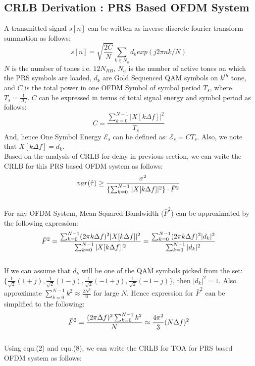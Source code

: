 \documentclass{article}
\begin{document}
\subsection{CRLB Derivation : PRS Based OFDM System}
A transmitted signal $s[n]$ can be written as inverse discrete fourier transform summation as follows:
$$s[n] = \sqrt{\frac{2C}{N}} \sum_{k \in N_a}d_k exp(j2\pi n k/N)$$
$N$ is the number of tones i.e. $12N_{RB}$, $N_a$ is the number of active tones on which the PRS symbols are loaded, $d_k$ are Gold Sequenced QAM symbols on $k^{th}$ tone, and $C$ is the total power in one OFDM Symbol of symbol period $T_s$, where $T_s = \frac{1}{\Delta f}$. $C$ can be expressed in terms of total signal energy and symbol period as follows:
$$C = \frac{\sum^{N-1}_{k=0}|X[k\Delta f]|^2}{T_s}$$
And, hence One Symbol Energy $\mathcal E_s$ can be defined as: $\mathcal E_s = C T_s$. Also, we note that $X[k \Delta f] = d_k$.
\\
Based on the analysis of CRLB for delay in previous section, we can write the CRLB for this PRS based OFDM system as follows:
\begin{equation} \label{eq6} \large
var(\hat{\tau}) \ge \frac{\sigma^2}{\{\sum^{N-1}_{k=0}|X[k\Delta f]|^2\}\cdot \bar{F}^2}
\end{equation}
\\
For any OFDM System, Mean-Squared Bandwidth ($\bar{F}^2$) can be approximated by the following expression:
\begin{equation} \label{eq7} \large
\bar{F}^2 = \frac{\sum^{N-1}_{k=0}(2\pi k\Delta f)^2|X[k\Delta f]|^2}{\sum^{N-1}_{k=0}|X[k\Delta f]|^2} = \frac{\sum^{N-1}_{k=0}(2\pi k\Delta f)^2|d_k|^2}{\sum^{N-1}_{k=0}|d_k|^2}
\end{equation}
\\
If we can assume that $d_k$ will be one of the QAM symbols picked from the set: $\{ \frac{1}{\sqrt{2}} (1+j) , \frac{1}{\sqrt{2}} (1-j), \frac{1}{\sqrt{2}} (-1+j), \frac{1}{\sqrt{2}} (-1-j) \}$, then $|d_k|^2 = 1$. Also approximate $\sum^{N-1}_{k=0}k^2 \approx \frac{2N^3}{6}$ for large $N$. Hence expression for $\bar{F}^2$ can be simplified to the following:
\\
\begin{equation} \label{eq8} \LARGE
\bar{F}^2 = \frac{(2\pi \Delta f)^2 \sum^{N-1}_{k=0}k^2}{N} \approx  \frac{4\pi^2}{3}(N\Delta f)^2
\end{equation}
\\
Using equ.(2) and equ.(8), we can write the CRLB for TOA for PRS based OFDM system as follows:
\\
\end{document}
